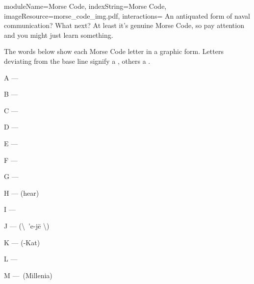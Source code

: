 \documentclass{../../ktane-mod}
\begin{document}
\begin{module}{
  moduleName=Morse Code,
  indexString=Morse Code,
  imageResource=morse_code_img.pdf,
  interactions=\keysymbol
}{
  An antiquated form of naval communication?
  What next?
  At least it's genuine Morse Code, so pay attention and you might just learn something.
}
  \begin{bulletlist}
  \end{bulletlist}



  The words below show each Morse Code letter in a graphic form.
  Letters deviating from the base line signify a \LIGHTBLUE[dash], others a \LIGHTRED[dot].
  \begin{multicols}{3}
    A --- \LIGHTRED[a]\LIGHTBLUE[t]

    B --- \LIGHTBLUE[b]\LIGHTRED[e]\LIGHTRED[a]\LIGHTRED[n]

    C --- \LIGHTBLUE[C]\LIGHTRED[a]\LIGHTBLUE[t]\LIGHTRED[e]

    D --- \LIGHTBLUE[d]\LIGHTRED[a]\LIGHTRED[m]

    E --- \LIGHTRED[e]

    F --- \LIGHTRED[c]\LIGHTRED[a]\LIGHTBLUE[f]\LIGHTRED[e]

    G --- \LIGHTBLUE[g]\LIGHTBLUE[y]\LIGHTRED[m]

    H --- \LIGHTRED[e]\LIGHTRED[a]\LIGHTRED[r]\LIGHTRED[s] (hear)

    I --- \LIGHTRED[i]\LIGHTRED[n]

    J --- \LIGHTRED[e]\LIGHTBLUE[d]\LIGHTBLUE[g]\LIGHTBLUE[y] (\textbackslash\ 'e-j\=e \textbackslash)

    K --- \LIGHTBLUE[K]\LIGHTRED[i]\LIGHTBLUE[t](-Kat)

    L --- \LIGHTRED[e]\LIGHTBLUE[l]\LIGHTRED[s]\LIGHTRED[e]

    M --- \LIGHTBLUE[M]\LIGHTBLUE[M] \,(Millenia)


\end{multicols}
\end{module}
\end{document}
